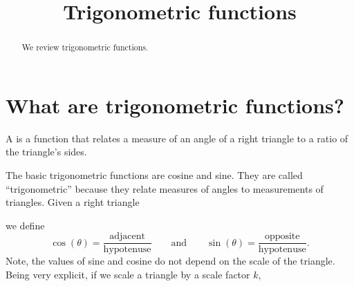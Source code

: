 \documentclass{ximera}
\title[Dig-In:]{Trigonometric functions}
\begin{document}
\begin{abstract}
  We review trigonometric functions.
\end{abstract}
\maketitle



\section{What are trigonometric functions?}

\begin{definition}
  A  is a function that relates a measure
  of an angle of a right triangle to a ratio of the triangle's sides.
\end{definition}


The basic trigonometric functions are cosine and sine. They are called
``trigonometric'' because they relate measures of angles to
measurements of triangles. Given a right triangle
\begin{image}[2in]
\end{image}
we define
\[
\cos(\theta) =
\frac{\text{adjacent}}{\text{hypotenuse}}\qquad\text{and}\qquad\sin(\theta)
= \frac{\text{opposite}}{\text{hypotenuse}}.
\]
Note, the values of sine and cosine do not depend on the scale of the
triangle. Being very explicit, if we scale a triangle by a scale
factor $k$,
\end{document}
